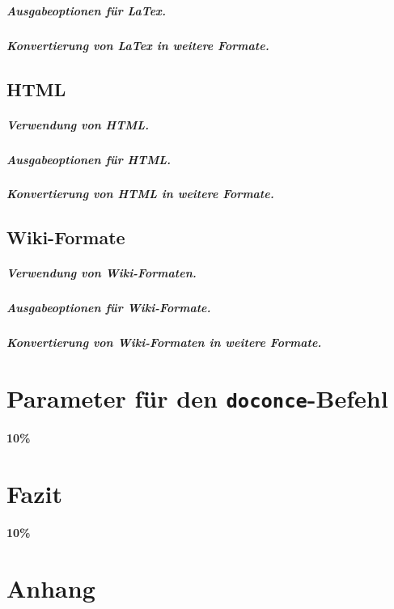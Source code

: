 \documentclass[%
oneside,                 %
final,                   %
chapterprefix=true,      %
open=right,              %
10pt]{book}
\begin{document}
\paragraph{ Ausgabeoptionen für LaTex.}
\paragraph{ Konvertierung von LaTex in weitere Formate.}
\section{HTML}
\paragraph{ Verwendung von HTML.}
\paragraph{ Ausgabeoptionen für HTML.}
\paragraph{ Konvertierung von HTML in weitere Formate.}
\section{Wiki-Formate}
\paragraph{ Verwendung von Wiki-Formaten.}
\paragraph{ Ausgabeoptionen für Wiki-Formate.}
\paragraph{ Konvertierung von Wiki-Formaten in weitere Formate.}
\chapter{Parameter für den \texttt{doconce}-Befehl}
\textbf{10\%}
\chapter{Fazit}
\textbf{10\%}
\chapter{Anhang}
\end{document}
